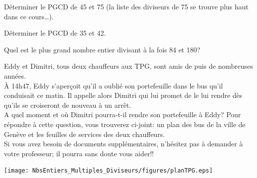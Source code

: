\begin{methode*1}
\exercice  
Déterminer le PGCD de 45 et 75 (la liste des diviseurs de 75 se trouve plus haut dans ce cours…).

\vspace{3em}

\exercice  
Déterminer le PGCD de 35 et 42.

\vspace{5em}

\exercice  
Quel est le plus grand nombre entier divisant à la fois 84 et 180?

\vspace{3em}

 \end{methode*1}
 \newpage
\begin{activite}
Eddy et Dimitri, tous deux chauffeurs aux TPG, sont amis de puis de nombreuses années.\\
À 14h47, Eddy s’aperçoit qu’il a oublié son portefeuille dans le bus qu’il conduisait ce matin. Il appelle alors Dimitri qui lui promet de le lui rendre dès qu’ils se croiseront de nouveau à un arrêt.\\
A quel moment et où Dimitri pourra-t-il rendre son portefeuille à Eddy?
\newline
Pour répondre à cette question, vous trouverez ci-joint: un plan des bus de la ville de Genève et les feuilles de services des deux chauffeurs.\\
Si vous avez besoin de documents supplémentaires, n'hésitez pas à demander à votre professeur; il pourra sans doute vous aider!!

\begin{center}
    \texttt{[image: NbsEntiers\_Multiples\_Diviseurs/figures/planTPG.eps]}\\
\end{center}


\end{activite}
